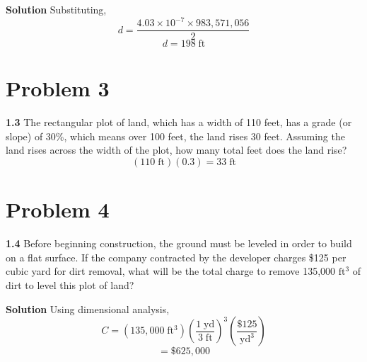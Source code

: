 \documentclass{article}
\begin{document}
\textbf{Solution} Substituting, 
\[ d = \frac{4.03 \times 10^{-7} \times 983,571,056}{2} \]
\[ \boxed{d = 198 \; \mathrm{ft}} \]

\section{Problem 3}

\textbf{1.3} The rectangular plot of land, which has a width of 110 feet, has a grade (or slope) of 30\%, which means over 100 feet, the land rises 30 feet. Assuming the land rises across the width of the plot, how many total feet does the land rise? 
\[(110 \; \mathrm{ft} ) ( 0.3) = \boxed{33 \; \mathrm{ft}}\]
\bigskip

\section{Problem 4}

\textbf{1.4} Before beginning construction, the ground must be leveled in order to build on a flat surface. If the company contracted by the developer charges \$125 per cubic yard for dirt removal, what will be the total charge to remove 135,000 $\mathrm{ft^3}$ of dirt to level this plot of land? \bigskip 

\textbf{Solution} Using dimensional analysis, 
\[ C = \mathrm{(135,000 \; ft^3)\left(\frac{1 \; yd}{3 \; ft}\right)^3\left(\frac{\$125}{yd^3}\right)}\]
\[ = \boxed{\$625,000 }\]
\end{document}
